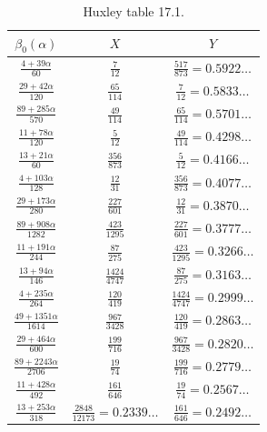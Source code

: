\begin{table}[ht]
    \caption{Huxley table 17.1.}
    \label{huxley-table-1}
    \centering
    \renewcommand{\arraystretch}{1.2}
    \begin{tabular}{|c|c|c|}
    \hline
    $\beta_0(\alpha)$  & $X$ & $Y$ \\
    \hline
    $\frac{4+39\alpha}{60}$ & $\frac{7}{12}$ & $\frac{517}{873} = 0.5922\dots$ \\
    \hline
    $\frac{29+42\alpha}{120}$ & $\frac{65}{114}$ & $\frac{7}{12} = 0.5833\dots$ \\
    \hline
    $\frac{89+285\alpha}{570}$ & $\frac{49}{114}$ & $\frac{65}{114} = 0.5701\dots$ \\
    \hline
    $\frac{11+78\alpha}{120}$ & $\frac{5}{12}$ & $\frac{49}{114} = 0.4298\dots$ \\
    \hline
    $\frac{13+21\alpha}{60}$ & $\frac{356}{873}$ & $\frac{5}{12} = 0.4166\dots$ \\
    \hline
    $\frac{4+103\alpha}{128}$ & $\frac{12}{31}$ & $\frac{356}{873} = 0.4077\dots$ \\
    \hline
    $\frac{29+173\alpha}{280}$ & $\frac{227}{601}$ & $\frac{12}{31} = 0.3870\dots$ \\
    \hline
    $\frac{89+908\alpha}{1282}$ & $\frac{423}{1295}$ & $\frac{227}{601} = 0.3777\dots$ \\
    \hline
    $\frac{11+191\alpha}{244}$ & $\frac{87}{275}$ & $\frac{423}{1295} = 0.3266\dots$ \\
    \hline
    $\frac{13+94\alpha}{146}$ & $\frac{1424}{4747}$ & $\frac{87}{275} = 0.3163\dots$\\
    \hline
    $\frac{4+235\alpha}{264}$ & $\frac{120}{419}$ & $\frac{1424}{4747}=0.2999\dots$ \\
    \hline
    $\frac{49+1351\alpha}{1614}$ & $\frac{967}{3428}$ & $\frac{120}{419} = 0.2863\dots$ \\
    \hline
    $\frac{29+464\alpha}{600}$ & $\frac{199}{716}$ & $\frac{967}{3428} = 0.2820\dots$ \\
    \hline
    $\frac{89+2243\alpha}{2706}$ & $\frac{19}{74}$ & $\frac{199}{716} = 0.2779\dots$ \\
    \hline
    $\frac{11+428\alpha}{492}$ & $\frac{161}{646}$ & $\frac{19}{74} = 0.2567\dots$ \\
    \hline
    $\frac{13+253\alpha}{318}$ & $\frac{2848}{12173} =0.2339\dots$ & $\frac{161}{646} = 0.2492\dots$ \\
    \hline
    \end{tabular}
    \end{table}

